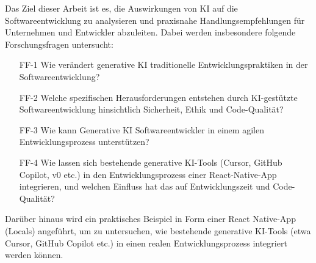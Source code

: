 Das Ziel dieser Arbeit ist es, die Auswirkungen von KI auf die Softwareentwicklung zu analysieren und praxisnahe Handlungsempfehlungen für Unternehmen und Entwickler abzuleiten. Dabei werden insbesondere folgende Forschungsfragen untersucht:

\begin{itemize}
    \item[FF-1] Wie verändert generative KI traditionelle Entwicklungspraktiken in der Softwareentwicklung?
    \item[FF-2] Welche spezifischen Herausforderungen entstehen durch KI-gestützte Softwareentwicklung hinsichtlich Sicherheit, Ethik und Code-Qualität?
    \item[FF-3] Wie kann Generative KI Softwareentwickler in einem agilen Entwicklungsprozess unterstützen? 
    \item[FF-4] Wie lassen sich bestehende generative KI-Tools (Cursor, GitHub Copilot, v0 etc.) in den Entwicklungsprozess einer React-Native-App integrieren, und welchen Einfluss hat das auf Entwicklungszeit und Code-Qualität?
\end{itemize}

Darüber hinaus wird ein praktisches Beispiel in Form einer React Native-App (Locals) angeführt, um zu untersuchen, wie bestehende generative KI-Tools (etwa Cursor, GitHub Copilot etc.) in einen realen Entwicklungsprozess integriert werden können.